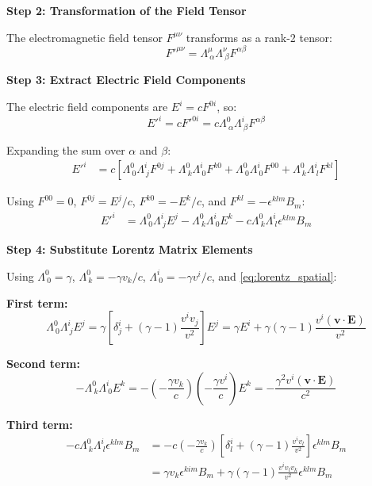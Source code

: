 \documentclass[12pt,a4paper]{article}
\begin{document}
\textbf{Step 2: Transformation of the Field Tensor}

The electromagnetic field tensor $F^{\mu\nu}$ transforms as a rank-2 tensor:
\begin{equation}
F'^{\mu\nu} = \Lambda^\mu_{\ \alpha} \Lambda^\nu_{\ \beta} F^{\alpha\beta}
\label{eq:tensor_transform}
\end{equation}

\textbf{Step 3: Extract Electric Field Components}

The electric field components are $E^i = c F^{0i}$, so:
\begin{equation}
E'^i = c F'^{0i} = c \Lambda^0_{\ \alpha} \Lambda^i_{\ \beta} F^{\alpha\beta}
\label{eq:Ei_transform_start}
\end{equation}

Expanding the sum over $\alpha$ and $\beta$:
\begin{align}
E'^i &= c \left[ \Lambda^0_{\ 0} \Lambda^i_{\ j} F^{0j}
+ \Lambda^0_{\ k} \Lambda^i_{\ 0} F^{k0}
+ \Lambda^0_{\ 0} \Lambda^i_{\ 0} F^{00}
+ \Lambda^0_{\ k} \Lambda^i_{\ l} F^{kl} \right]
\end{align}

Using $F^{00} = 0$, $F^{0j} = E^j/c$, $F^{k0} = -E^k/c$, and
$F^{kl} = -\epsilon^{klm} B_m$:
\begin{align}
E'^i &= \Lambda^0_{\ 0} \Lambda^i_{\ j} E^j
- \Lambda^0_{\ k} \Lambda^i_{\ 0} E^k
- c \Lambda^0_{\ k} \Lambda^i_{\ l} \epsilon^{klm} B_m
\label{eq:Ei_expanded}
\end{align}

\textbf{Step 4: Substitute Lorentz Matrix Elements}

Using $\Lambda^0_{\ 0} = \gamma$, $\Lambda^0_{\ k} = -\gamma v_k/c$,
$\Lambda^i_{\ 0} = -\gamma v^i/c$, and \eqref{eq:lorentz_spatial}:

\textbf{First term:}
\begin{equation}
\Lambda^0_{\ 0} \Lambda^i_{\ j} E^j = \gamma \left[\delta^i_j + (\gamma-1)\frac{v^i v_j}{v^2}\right] E^j
= \gamma E^i + \gamma(\gamma-1)\frac{v^i (\bm{v} \cdot \bm{E})}{v^2}
\end{equation}

\textbf{Second term:}
\begin{equation}
-\Lambda^0_{\ k} \Lambda^i_{\ 0} E^k = -\left(-\frac{\gamma v_k}{c}\right)
\left(-\frac{\gamma v^i}{c}\right) E^k
= -\frac{\gamma^2 v^i (\bm{v} \cdot \bm{E})}{c^2}
\end{equation}

\textbf{Third term:}
\begin{align}
-c \Lambda^0_{\ k} \Lambda^i_{\ l} \epsilon^{klm} B_m
&= -c \left(-\frac{\gamma v_k}{c}\right)
\left[\delta^i_l + (\gamma-1)\frac{v^i v_l}{v^2}\right] \epsilon^{klm} B_m \\
&= \gamma v_k \epsilon^{kim} B_m + \gamma(\gamma-1)\frac{v^i v_l v_k}{v^2} \epsilon^{klm} B_m
\end{align}
\end{document}
